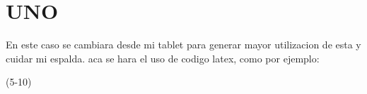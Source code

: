 \section{UNO}
   En este caso se cambiara desde mi tablet para generar mayor utilizacion de esta y cuidar mi espalda.
			aca se hara el uso de codigo latex, como por ejemplo:

\lipsum(5-10)